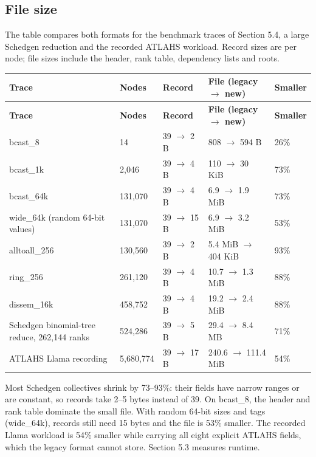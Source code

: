 \documentclass[10pt,a4paper]{article}
\begin{document}
\hypertarget{file-size}{}
\subsection{File size}

The table compares both formats for the benchmark traces of Section 5.4, a large Schedgen reduction and the recorded ATLAHS workload. Record sizes are per node; file sizes include the header, rank table, dependency lists and roots.

{\small
\begin{longtable}{P{0.34\dimexpr{}\tabcolsep\relax}P{0.12\dimexpr{}\tabcolsep\relax}P{0.14\dimexpr{}\tabcolsep\relax}P{0.28\dimexpr{}\tabcolsep\relax}P{0.12\dimexpr{}\tabcolsep\relax}}
\toprule
\textbf{Trace} & \textbf{Nodes} & \textbf{Record} & \textbf{File (legacy \(\rightarrow\) new)} & \textbf{Smaller} \\
\midrule
\endfirsthead
\toprule
\textbf{Trace} & \textbf{Nodes} & \textbf{Record} & \textbf{File (legacy \(\rightarrow\) new)} & \textbf{Smaller} \\
\midrule
\endhead
\bottomrule
\endfoot
bcast\_8 & 14 & 39 \(\rightarrow\) 2 B & 808 \(\rightarrow\) 594 B & 26\% \\
bcast\_1k & 2,046 & 39 \(\rightarrow\) 4 B & 110 \(\rightarrow\) 30 KiB & 73\% \\
bcast\_64k & 131,070 & 39 \(\rightarrow\) 4 B & 6.9 \(\rightarrow\) 1.9 MiB & 73\% \\
wide\_64k (random 64-bit values) & 131,070 & 39 \(\rightarrow\) 15 B & 6.9 \(\rightarrow\) 3.2 MiB & 53\% \\
alltoall\_256 & 130,560 & 39 \(\rightarrow\) 2 B & 5.4 MiB \(\rightarrow\) 404 KiB & 93\% \\
ring\_256 & 261,120 & 39 \(\rightarrow\) 4 B & 10.7 \(\rightarrow\) 1.3 MiB & 88\% \\
dissem\_16k & 458,752 & 39 \(\rightarrow\) 4 B & 19.2 \(\rightarrow\) 2.4 MiB & 88\% \\
Schedgen binomial-tree reduce, 262,144 ranks & 524,286 & 39 \(\rightarrow\) 5 B & 29.4 \(\rightarrow\) 8.4 MB & 71\% \\
ATLAHS Llama recording & 5,680,774 & 39 \(\rightarrow\) 17 B & 240.6 \(\rightarrow\) 111.4 MiB & 54\% \\
\end{longtable}
}

Most Schedgen collectives shrink by 73--93\%: their fields have narrow ranges or are constant, so records take 2--5 bytes instead of 39. On bcast\_8, the header and rank table dominate the small file. With random 64-bit sizes and tags (wide\_64k), records still need 15 bytes and the file is 53\% smaller. The recorded Llama workload is 54\% smaller while carrying all eight explicit ATLAHS fields, which the legacy format cannot store. Section 5.3 measures runtime.
\end{document}
